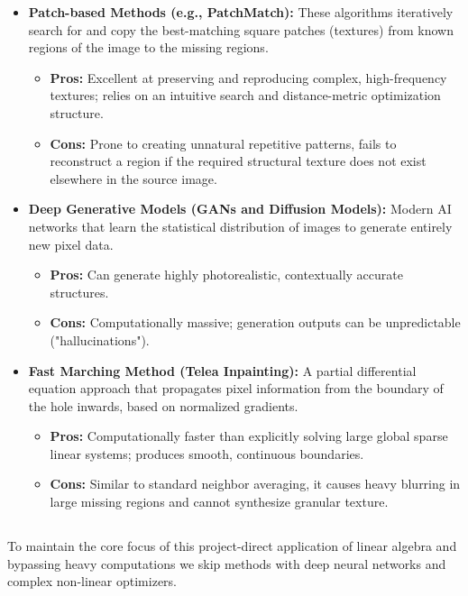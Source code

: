 \documentclass[12pt]{article}
\begin{document}
\begin{itemize}
    \item \textbf{Patch-based Methods (e.g., PatchMatch):} These algorithms iteratively search for and copy the best-matching square patches (textures) from known regions of the image to the missing regions.
    \begin{itemize}
        \item \textbf{Pros:} Excellent at preserving and reproducing complex, high-frequency textures; relies on an intuitive search and distance-metric optimization structure.
        \item \textbf{Cons:} Prone to creating unnatural repetitive patterns, fails to reconstruct a region if the required structural texture does not exist elsewhere in the source image.
    \end{itemize}
    
    \item \textbf{Deep Generative Models (GANs and Diffusion Models):} Modern AI networks that learn the statistical distribution of images to generate entirely new pixel data.
    \begin{itemize}
        \item \textbf{Pros:} Can generate highly photorealistic, contextually accurate structures.
        \item \textbf{Cons:} Computationally massive; generation outputs can be unpredictable ("hallucinations").
    \end{itemize}

    \item \textbf{Fast Marching Method (Telea Inpainting):} A partial differential equation approach that propagates pixel information from the boundary of the hole inwards, based on normalized gradients.
    \begin{itemize}
        \item \textbf{Pros:} Computationally faster than explicitly solving large global sparse linear systems; produces smooth, continuous boundaries.
        \item \textbf{Cons:} Similar to standard neighbor averaging, it causes heavy blurring in large missing regions and cannot synthesize granular texture.
    \end{itemize}
\end{itemize}

\subsection*{}
To maintain the core focus of this project-direct application of linear algebra and bypassing heavy computations we skip methods with deep neural networks and complex non-linear optimizers.
\end{document}
